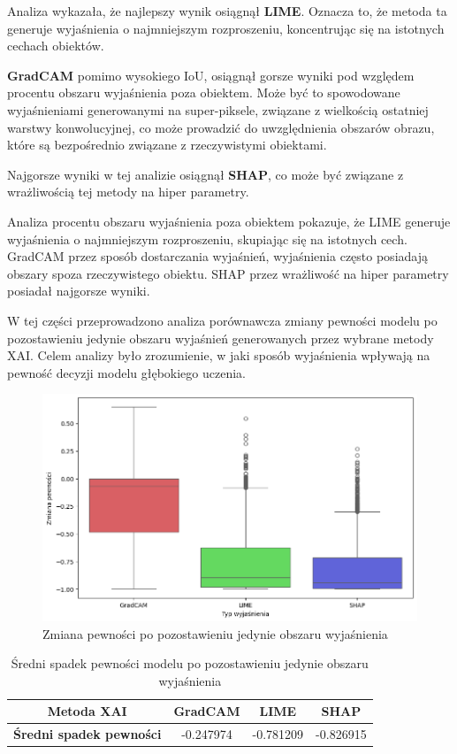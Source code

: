 Analiza wykazała, że najlepszy wynik osiągnął \textbf{LIME}.
Oznacza to, że metoda ta generuje wyjaśnienia o najmniejszym rozproszeniu, koncentrując się na istotnych cechach obiektów.

\textbf{GradCAM} pomimo wysokiego IoU, osiągnął gorsze wyniki pod względem procentu obszaru wyjaśnienia poza obiektem.
Może być to spowodowane wyjaśnieniami generowanymi na super-piksele, związane z wielkością ostatniej warstwy konwolucyjnej, co może prowadzić do uwzględnienia obszarów obrazu, które są bezpośrednio związane z rzeczywistymi obiektami.

Najgorsze wyniki w tej analizie osiągnął \textbf{SHAP}, co może być związane z wrażliwością tej metody na hiper parametry.

Analiza procentu obszaru wyjaśnienia poza obiektem pokazuje, że LIME generuje wyjaśnienia o najmniejszym rozproszeniu, skupiając się na istotnych cech.
GradCAM przez sposób dostarczania wyjaśnień, wyjaśnienia często posiadają obszary spoza rzeczywistego obiektu.
SHAP przez wrażliwość na hiper parametry posiadał najgorsze wyniki.

\vspace{1cm}

W tej części przeprowadzono analiza porównawcza zmiany pewności modelu po pozostawieniu jedynie obszaru wyjaśnień generowanych przez wybrane metody XAI. 
Celem analizy było zrozumienie, w jaki sposób wyjaśnienia wpływają na pewność decyzji modelu głębokiego uczenia.

\begin{figure}[h]
	\centering\includegraphics[width=.9\textwidth]{img/base_confidence_exp}
	\caption{Zmiana pewności po pozostawieniu jedynie obszaru wyjaśnienia}  \label{rys:base_confidence_exp}
\end{figure}

\begin{table}[h]
	\centering
	\begin{tabular}{|c|c|c|c|}
		\hline
		\textbf{Metoda XAI}             & \textbf{GradCAM} & \textbf{LIME} & \textbf{SHAP} \\
		\hline
		\textbf{Średni spadek pewności} & -0.247974        & -0.781209     & -0.826915     \\
		\hline
	\end{tabular}
	\caption{Średni spadek pewności modelu po pozostawieniu jedynie obszaru wyjaśnienia}
	\label{tab:base_confidence_exp}
\end{table}

